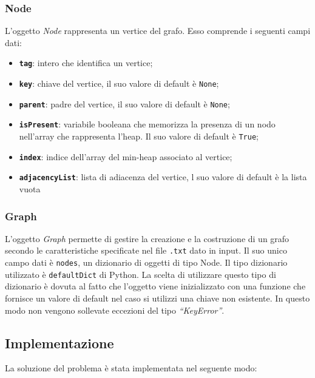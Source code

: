 	\subsubsection{Node}
	L'oggetto \textit{Node} rappresenta un vertice del grafo. 
	Esso comprende i seguenti campi dati:
	\begin{itemize}
		\item \texttt{\textbf{tag}}: intero che identifica un vertice;
		\item \texttt{\textbf{key}}: chiave del vertice, il suo valore di default è \texttt{None};
		\item \texttt{\textbf{parent}}: padre del vertice, il suo valore di default è \texttt{None};
		\item \texttt{\textbf{isPresent}}: variabile booleana che memorizza la presenza di un nodo nell'array che rappresenta l'heap. Il suo valore di default è \texttt{True};
		\item \texttt{\textbf{index}}: indice dell'array del min-heap associato al vertice; 
		\item \texttt{\textbf{adjacencyList}}: lista di adiacenza del vertice, l suo valore di default è la lista vuota
	\end{itemize}
	
	\subsubsection{Graph}
		L'oggetto \textit{Graph} permette di gestire la creazione e la costruzione di un grafo secondo le caratteristiche specificate nel file \texttt{.txt} dato in input. 
		Il suo unico campo dati è \texttt{nodes}, un dizionario di oggetti di tipo Node. 
		Il tipo dizionario utilizzato è \texttt{defaultDict} di Python. 
		La scelta di utilizzare questo tipo di dizionario è dovuta al fatto che l'oggetto viene inizializzato con una funzione che fornisce un valore di default nel caso si utilizzi una chiave non esistente. 
		In questo modo non vengono sollevate eccezioni del tipo \textit{``KeyError''}.

\subsection{Implementazione}

	La soluzione del problema è stata implementata nel seguente modo:
	
